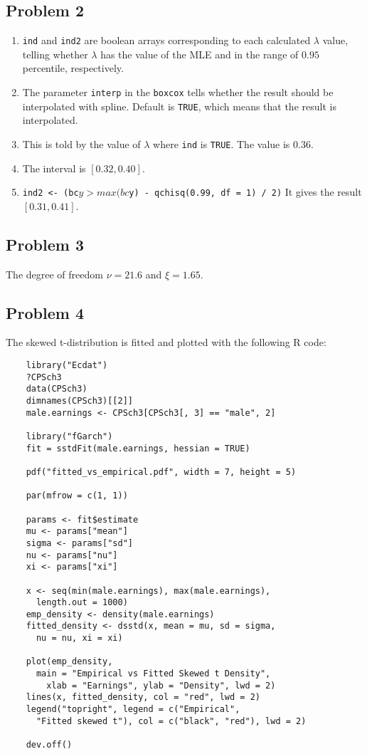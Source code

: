 \documentclass{article}
\begin{document}
\subsection{Problem 2}
\begin{enumerate}[label=(\alph*)]
    \item \texttt{ind} and \texttt{ind2} are boolean arrays corresponding to each calculated $\lambda$ value,
          telling whether $\lambda$ has the value of the MLE and in the range of $0.95$ percentile, respectively.
    \item The parameter \texttt{interp} in the \texttt{boxcox} tells whether the result should be interpolated with spline. Default is \texttt{TRUE}, which means that the result is interpolated.
    \item This is told by the value of $\lambda$ where \texttt{ind} is \texttt{TRUE}. The value is $0.36$.
    \item The interval is $[0.32, 0.40]$.
    \item \texttt{ind2 <- (bc$y > max(bc$y) - qchisq(0.99, df = 1) / 2)} It gives the result $[0.31, 0.41]$.
\end{enumerate}


\subsection{Problem 3}
The degree of freedom $\nu = 21.6$ and $\xi = 1.65$.

\subsection{Problem 4}
The skewed t-distribution is fitted and plotted with the following R code:
\begin{verbatim}
    library("Ecdat")
    ?CPSch3
    data(CPSch3)
    dimnames(CPSch3)[[2]]
    male.earnings <- CPSch3[CPSch3[, 3] == "male", 2]

    library("fGarch")
    fit = sstdFit(male.earnings, hessian = TRUE)

    pdf("fitted_vs_empirical.pdf", width = 7, height = 5)

    par(mfrow = c(1, 1))

    params <- fit$estimate
    mu <- params["mean"]
    sigma <- params["sd"]
    nu <- params["nu"]
    xi <- params["xi"]

    x <- seq(min(male.earnings), max(male.earnings),
      length.out = 1000)
    emp_density <- density(male.earnings)
    fitted_density <- dsstd(x, mean = mu, sd = sigma,
      nu = nu, xi = xi)

    plot(emp_density,
      main = "Empirical vs Fitted Skewed t Density",
        xlab = "Earnings", ylab = "Density", lwd = 2)
    lines(x, fitted_density, col = "red", lwd = 2)
    legend("topright", legend = c("Empirical",
      "Fitted skewed t"), col = c("black", "red"), lwd = 2)

    dev.off()
\end{verbatim}
\end{document}
